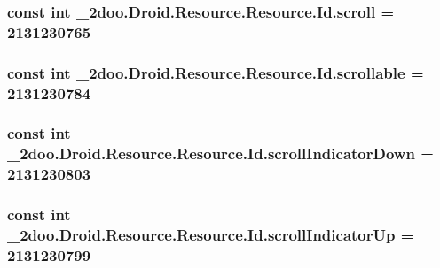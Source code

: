 \hypertarget{class__2doo_1_1_droid_1_1_resource_1_1_id_001f6bf8715fd990bd20d62eb637475e}{
\subsubsection[{scroll}]{\setlength{\rightskip}{0pt plus 5cm}const int \_\-2doo.Droid.Resource.Resource.Id.scroll = 2131230765}}
\label{class__2doo_1_1_droid_1_1_resource_1_1_id_001f6bf8715fd990bd20d62eb637475e}


\hypertarget{class__2doo_1_1_droid_1_1_resource_1_1_id_db88cabb66d4888499eb29e3608da005}{
\subsubsection[{scrollable}]{\setlength{\rightskip}{0pt plus 5cm}const int \_\-2doo.Droid.Resource.Resource.Id.scrollable = 2131230784}}
\label{class__2doo_1_1_droid_1_1_resource_1_1_id_db88cabb66d4888499eb29e3608da005}


\hypertarget{class__2doo_1_1_droid_1_1_resource_1_1_id_f281a452d670f7ff2e2c706a6e651aa5}{
\subsubsection[{scrollIndicatorDown}]{\setlength{\rightskip}{0pt plus 5cm}const int \_\-2doo.Droid.Resource.Resource.Id.scrollIndicatorDown = 2131230803}}
\label{class__2doo_1_1_droid_1_1_resource_1_1_id_f281a452d670f7ff2e2c706a6e651aa5}


\hypertarget{class__2doo_1_1_droid_1_1_resource_1_1_id_b721ba8f782f862979b59971d01852bb}{
\subsubsection[{scrollIndicatorUp}]{\setlength{\rightskip}{0pt plus 5cm}const int \_\-2doo.Droid.Resource.Resource.Id.scrollIndicatorUp = 2131230799}}
\label{class__2doo_1_1_droid_1_1_resource_1_1_id_b721ba8f782f862979b59971d01852bb}



